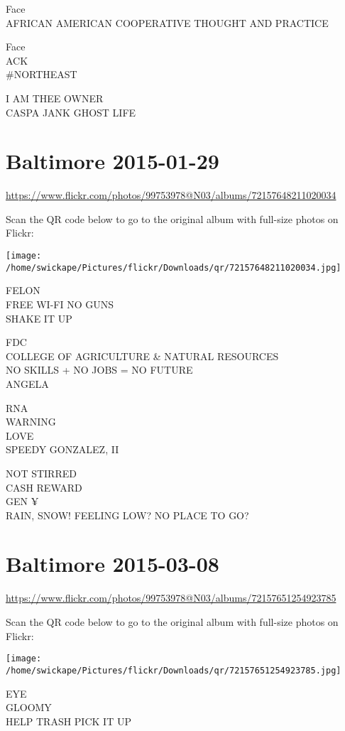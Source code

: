 \documentclass[10pt,letterpaper]{article}
\begin{document}
Face\\
AFRICAN AMERICAN COOPERATIVE THOUGHT AND PRACTICE

Face\\
ACK\\
\#NORTHEAST

I AM THEE OWNER\\
CASPA JANK GHOST LIFE


\section*{Baltimore 2015-01-29}

\url{https://www.flickr.com/photos/99753978@N03/albums/72157648211020034}

Scan the QR code below to go to the original album with full-size photos on Flickr:

\texttt{[image: /home/swickape/Pictures/flickr/Downloads/qr/72157648211020034.jpg]}


FELON\\
FREE WI{-}FI NO GUNS\\
SHAKE IT UP

FDC\\
COLLEGE OF AGRICULTURE \& NATURAL RESOURCES\\
NO SKILLS + NO JOBS = NO FUTURE\\
ANGELA

RNA\\
WARNING\\
LOVE\\
SPEEDY GONZALEZ, II

NOT STIRRED\\
CASH REWARD\\
GEN ¥\\
RAIN, SNOW!  FEELING LOW?  NO PLACE TO GO?


\section*{Baltimore 2015-03-08}

\url{https://www.flickr.com/photos/99753978@N03/albums/72157651254923785}

Scan the QR code below to go to the original album with full-size photos on Flickr:

\texttt{[image: /home/swickape/Pictures/flickr/Downloads/qr/72157651254923785.jpg]}


EYE\\
GLOOMY\\
HELP TRASH PICK IT UP
\end{document}
